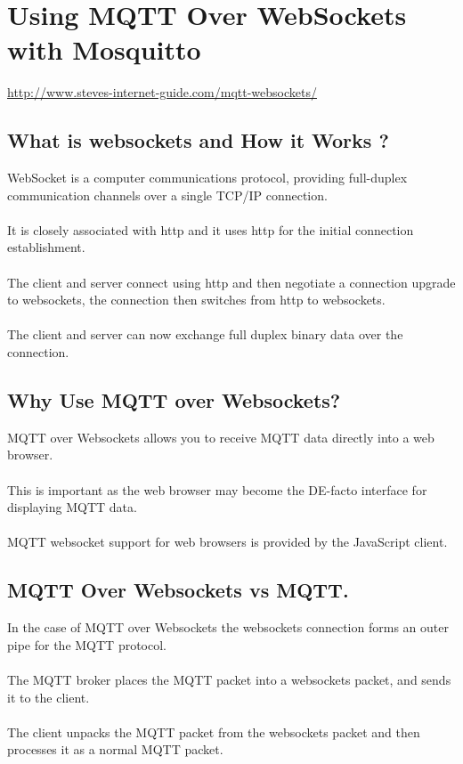 \documentclass[oneside]{book}
\begin{document}
\chapter{Using MQTT Over WebSockets with Mosquitto}
\url{http://www.steves-internet-guide.com/mqtt-websockets/}
\section{What is websockets and How it Works ?}
WebSocket is a computer communications protocol, providing full-duplex communication channels over a single TCP/IP connection.
\\\\
It is closely associated with http and it uses http for the initial connection establishment.
\\\\
The client and server connect using http and then negotiate a connection upgrade to websockets, the connection then switches from http to websockets.
\\\\
The client and server can now exchange full duplex binary data over the connection.

\section{Why Use MQTT over Websockets?}
MQTT over Websockets allows you to receive MQTT data directly into a web browser.
\\\\
This is important as the web browser may become the DE-facto interface for displaying MQTT data.
\\\\
MQTT websocket support for web browsers is provided by the JavaScript client.

\section{MQTT Over Websockets vs MQTT.}
In the case of MQTT over Websockets the websockets connection forms an outer pipe for the MQTT protocol.
\\\\
The  MQTT broker places the MQTT packet into a websockets packet, and sends it to the client.
\\\\
The client unpacks the MQTT packet from the websockets packet and then processes it as a normal MQTT packet.
\end{document}
